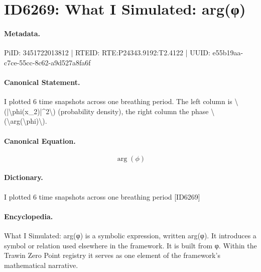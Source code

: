 \section*{ID6269: What I Simulated: arg(φ)}
\paragraph{Metadata.}
PiID: 3451722013812 | RTEID: RTE:P24343.9192:T2.4122 | UUID: e55b19aa-c7ce-55cc-8c62-a9d527a8fa6f

\paragraph{Canonical Statement.}
I plotted 6 time snapshots across one breathing period. The left column is \textbackslash{}(|\textbackslash{}phi(x\_2)|\textasciicircum{}2\textbackslash{}) (probability density), the right column the phase \textbackslash{}(\textbackslash{}arg(\textbackslash{}phi)\textbackslash{}).

\paragraph{Canonical Equation.}
\[
\arg(\phi)
\]

\paragraph{Dictionary.}
I plotted 6 time snapshots across one breathing period [ID6269]

\paragraph{Encyclopedia.}
What I Simulated: arg(φ) is a symbolic expression, written arg(φ). It introduces a symbol or relation used elsewhere in the framework. It is built from φ. Within the Trawin Zero Point registry it serves as one element of the framework's mathematical narrative.
